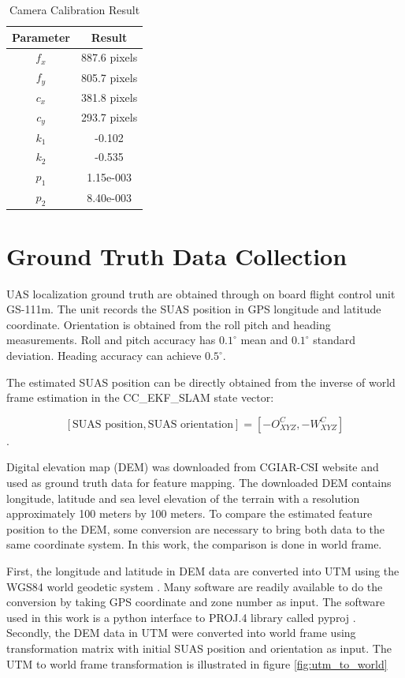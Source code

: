 \begin{table}[h]
\caption{Camera Calibration Result}
\label{tab:camcalresult}
\centering
\begin{tabular}{|c|c|}
\hline
Parameter & Result\\ \hline
$f_x$ & 887.6 pixels \\ \hline
$f_y$ & 805.7 pixels\\ \hline
$c_x$ & 381.8 pixels\\ \hline
$c_y$ & 293.7 pixels\\ \hline
$k_1$ & -0.102 \\ \hline
$k_2$ & -0.535 \\ \hline
$p_1$ & 1.15e-003 \\ \hline
$p_2$ & 8.40e-003 \\
\hline
\end{tabular}
\end{table}
\FloatBarrier

\section{Ground Truth Data Collection}
UAS localization ground truth are obtained through on board flight control unit GS-111m. The unit records the SUAS position in GPS longitude and latitude coordinate. Orientation is obtained from the roll pitch and heading measurements. Roll and pitch accuracy has $0.1^\circ$ mean and $0.1^\circ$ standard deviation. Heading accuracy can achieve $0.5^\circ$.\cite{_athena_????}

The estimated SUAS position can be directly obtained from the inverse of world frame estimation in the CC\_EKF\_SLAM state vector:

$$[\text{SUAS position}, \text{SUAS orientation}] = 
[-O_{XYZ}^{C}, -W_{XYZ}^{C}]$$.

Digital elevation map (DEM) was downloaded from CGIAR-CSI website \cite{_cgiar-csi_????} and used as ground truth data for feature mapping. The downloaded DEM contains longitude, latitude and sea level elevation of the terrain with a resolution approximately 100 meters by 100 meters. To compare the estimated feature position to the DEM, some conversion are necessary to bring both data to the same coordinate system. In this work, the comparison is done in world frame. 

First, the longitude and latitude in DEM data are converted into UTM using the WGS84 world geodetic system \cite{_world_????}. Many software are readily available to do the conversion by taking GPS coordinate and zone number as input. The software used in this work is a python interface to PROJ.4 library \cite{_pyproj_????} called pyproj \cite{_pyproj_????}. Secondly, the DEM data in UTM were converted into world frame using transformation matrix with initial SUAS position and orientation as input. The UTM to world frame transformation is illustrated in figure \ref{fig:utm_to_world}


